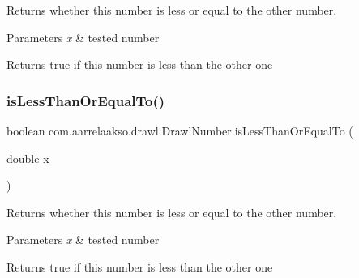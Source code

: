 Returns whether this number is less or equal to the other number. 


\begin{DoxyParams}{Parameters}
{\em x} & tested number \\
\hline
\end{DoxyParams}
\begin{DoxyReturn}{Returns}
true if this number is less than the other one 
\end{DoxyReturn}
\mbox{\label{classcom_1_1aarrelaakso_1_1drawl_1_1_drawl_number_a1e3afd1ca075c1381ee90261a2e31694}} 
\subsubsection{\texorpdfstring{is\+Less\+Than\+Or\+Equal\+To()}{isLessThanOrEqualTo()}\hspace{0.1cm}{\footnotesize\ttfamily [2/2]}}
{\footnotesize\ttfamily boolean com.\+aarrelaakso.\+drawl.\+Drawl\+Number.\+is\+Less\+Than\+Or\+Equal\+To (\begin{DoxyParamCaption}\item[{double}]{x }\end{DoxyParamCaption})\hspace{0.3cm}{\ttfamily [protected]}}



Returns whether this number is less or equal to the other number. 


\begin{DoxyParams}{Parameters}
{\em x} & tested number \\
\hline
\end{DoxyParams}
\begin{DoxyReturn}{Returns}
true if this number is less than the other one 
\end{DoxyReturn}
\mbox{\label{classcom_1_1aarrelaakso_1_1drawl_1_1_drawl_number_a48b4f9d41317fa1d11020b9fe4a489cf}} 
